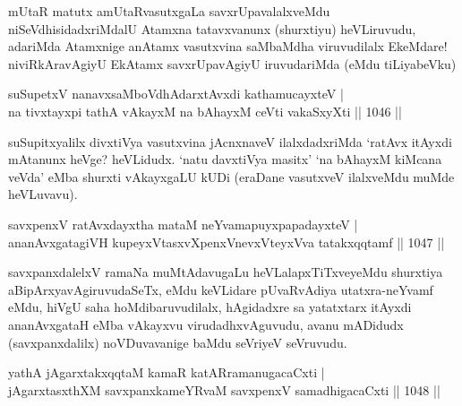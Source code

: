 \begin{artha}
mUtaR matutx amUtaRvasutxgaLa savxrUpavalalxveMdu niSeVdhisidadxriMdalU Atamxna tatavxvanunx (shurxtiyu) heVLiruvudu, adariMda Atamxnige anAtamx vasutxvina saMbaMdha viruvudilalx EkeMdare! niviRkAravAgiyU EkAtamx savxrUpavAgiyU iruvudariMda (eMdu tiLiyabeVku)
\end{artha}


\begin{shl}
suSupetxV nanavxsaMboVdhAdarxtAvxdi kathamucayxteV | \\
na tivxtayxpi tathA vAkayxM na bAhayxM ceVti vakaSxyXti \hfill||  1046 ||  
\end{shl}

\begin{artha}
suSupitxyalilx divxtiVya vasutxvina jAcnxnaveV ilalxdadxriMda `ratAvx itAyxdi mAtanunx heVge? heVLidudx. `natu davxtiVya masitx' `na bAhayxM kiMcana veVda' eMba shurxti vAkayxgaLU kUDi (eraDane vasutxveV ilalxveMdu muMde heVLuvavu).
\end{artha}


\begin{shl}
savxpenxV ratAvxdayxtha mataM neYvamapuyxpapadayxteV | \\
ananAvxgatagiVH kupeyxVtasxvXpenxV\s nevxVteyxVva tatakxqqtamf \hfill||  1047 ||  
\end{shl}

\begin{artha}
savxpanxdalelxV ramaNa muMtAdavugaLu heVLalapxTiTxveyeMdu shurxtiya aBipArxyavAgiruvudaSeTx, eMdu keVLidare pUvaRvAdiya utatxra-neYvamf eMdu, hiVgU saha hoMdibaruvudilalx, hAgidadxre sa yatatxtarx itAyxdi ananAvxgataH eMba vAkayxvu virudadhxvAguvudu, avanu mADidudx (savxpanxdalilx) noVDuvavanige baMdu seVriyeV seVruvudu.                         
\end{artha}

\begin{shl}
yathA jAgarxtakxqqtaM kamaR katARramanugacaCxti | \\
jAgarxtasxthXM savxpanxkameYRvaM savxpenxV samadhigacaCxti \hfill||  1048 ||  
\end{shl}


